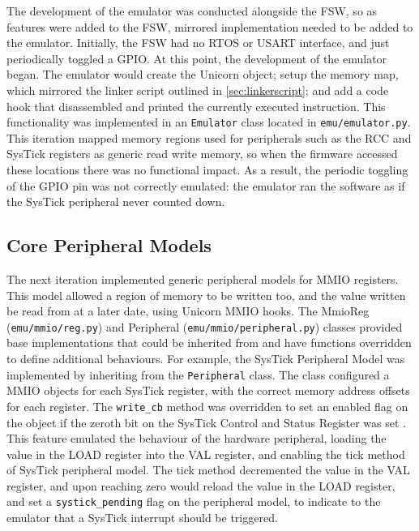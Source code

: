 \documentclass[../report.tex]{subfiles}
\begin{document}
The development of the emulator was conducted alongside the FSW, so as features
were added to the FSW, mirrored implementation needed to be added to the
emulator. Initially, the FSW had no RTOS or USART interface, and just
periodically toggled a GPIO. At this point, the development of the emulator
began. The emulator would create the Unicorn object; setup the memory map,
which mirrored the linker script outlined in \autoref{sec:linkerscript}; and
add a code hook that disassembled and printed the currently executed
instruction. This functionality was implemented in an \lstinline|Emulator|
class located in \lstinline|emu/emulator.py|.
This iteration mapped memory regions used for peripherals such as
the RCC and SysTick registers as generic read write memory, so when the
firmware accessed these locations there was no functional impact. As a result,
the periodic toggling of the GPIO pin was not correctly emulated: the emulator
ran the software as if the SysTick peripheral never counted down.

\subsection{Core Peripheral Models}

The next iteration implemented generic peripheral models for MMIO registers.
This model allowed a region of memory to be written too, and the value written
be read from at a later date, using Unicorn MMIO hooks. The MmioReg
(\lstinline|emu/mmio/reg.py|) and Peripheral
(\lstinline|emu/mmio/peripheral.py|) classes provided base implementations that
could be inherited from and have functions overridden to define additional
behaviours. For example, the SysTick Peripheral Model was implemented by
inheriting from the \lstinline|Peripheral| class. The class configured a MMIO
objects for each SysTick register, with the correct memory address offsets for
each register. The \lstinline|write_cb| method was overridden to set an enabled
flag on the object if the zeroth bit on the SysTick Control and Status Register
was set \citep{armcm4_manual}. This feature emulated the behaviour of the
hardware peripheral, loading the value in the LOAD register into the VAL
register, and enabling the tick method of SysTick peripheral model. The tick
method decremented the value in the VAL register, and upon reaching zero would
reload the value in the LOAD register, and set a \lstinline|systick_pending|
flag on the peripheral model, to indicate to the emulator that a SysTick
interrupt should be triggered.
\end{document}
